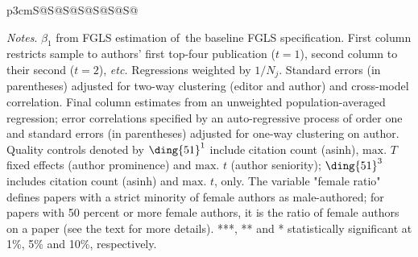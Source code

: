 \begin{table}
\begin{threeparttable}
\begin{tabular}{p{3cm}S@{}S@{}S@{}S@{}S@{}S@{}S@{}}
        \end{tabular}
        \begin{tablenotes}
            \tiny
            \item \textit{Notes}. \(\beta_1\) from FGLS estimation of~the baseline FGLS specification. First column restricts sample to authors' first top-four publication (\(t=1\)), second column to their second (\(t=2\)), \textit{etc.} Regressions weighted by \(1/N_j\). Standard errors (in parentheses) adjusted for two-way clustering (editor and author) and cross-model correlation. Final column estimates from an unweighted population-averaged regression; error correlations specified by an auto-regressive process of order one and standard errors (in parentheses) adjusted for one-way clustering on author. Quality controls denoted by \(\text{\ding{51}}^1\) include citation count (asinh), \(\text{max. }T\) fixed effects (author prominence) and \(\text{max. }t\) (author seniority); \(\text{\ding{51}}^3\) includes citation count (asinh) and \(\text{max. }t\), only. The variable "female ratio" defines papers with a strict minority of female authors as male-authored; for papers with 50 percent or more female authors, it is the ratio of female authors on a paper (see the text for more details). ***, ** and * statistically significant at 1\%, 5\% and 10\%, respectively.
        \end{tablenotes}
    \end{threeparttable}
\end{table}